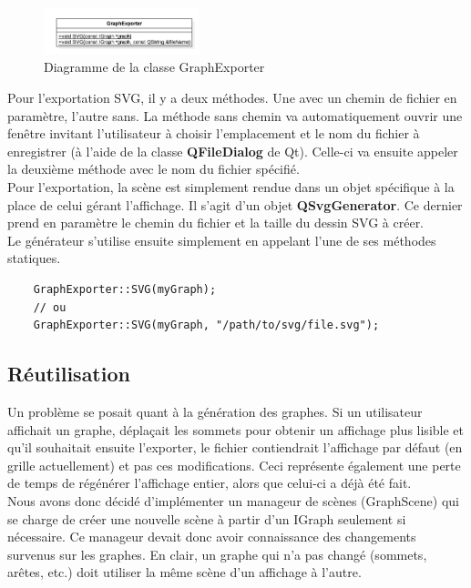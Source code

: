 \documentclass[french]{article}
\begin{document}
	\begin{figure}[H]
		\centering
		\includegraphics[width=0.4\textwidth]{Conception/visualization/graphexporter.png}
		\caption{Diagramme de la classe GraphExporter}
	\end{figure}
	
	Pour l'exportation SVG, il y a deux méthodes. Une avec un chemin de fichier en paramètre, l'autre sans. La méthode sans chemin va automatiquement ouvrir une fenêtre invitant l'utilisateur à choisir l'emplacement et le nom du fichier à enregistrer (à l'aide de la classe \textbf{QFileDialog} de Qt). Celle-ci va ensuite appeler la deuxième méthode avec le nom du fichier spécifié. \\
	Pour l'exportation, la scène est simplement rendue dans un objet spécifique à la place de celui gérant l'affichage. Il s'agit d'un objet \textbf{QSvgGenerator}. Ce dernier prend en paramètre le chemin du fichier et la taille du dessin SVG à créer. \\
	
	Le générateur s'utilise ensuite simplement en appelant l'une de ses méthodes statiques.
	
	\begin{lstlisting}
	GraphExporter::SVG(myGraph);
	// ou
	GraphExporter::SVG(myGraph, "/path/to/svg/file.svg");
	\end{lstlisting}
	
	\subsection{Réutilisation}
	Un problème se posait quant à la génération des graphes. Si un utilisateur affichait un graphe, déplaçait les sommets pour obtenir un affichage plus lisible et qu'il souhaitait ensuite l'exporter, le fichier contiendrait l'affichage par défaut (en grille actuellement) et pas ces modifications. Ceci représente également une perte de temps de régénérer l'affichage entier, alors que celui-ci a déjà été fait. \\
	Nous avons donc décidé d'implémenter un manageur de scènes (GraphScene) qui se charge de créer une nouvelle scène à partir d'un IGraph seulement si nécessaire. Ce manageur devait donc avoir connaissance des changements survenus sur les graphes. En clair, un graphe qui n'a pas changé (sommets, arêtes, etc.) doit utiliser la même scène d'un affichage à l'autre. \\
	
\end{document}
